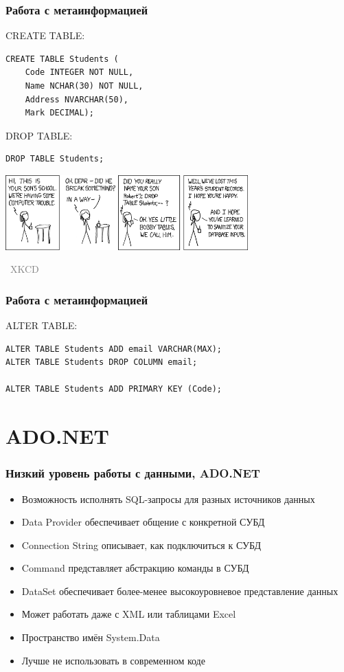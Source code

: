 \documentclass[xetex,mathserif,serif]{beamer}
\newcommand{\attribution}[1] {
\vspace{-5mm}\begin{flushright}\begin{scriptsize}\textcolor{gray}{\textcopyright\, #1}\end{scriptsize}\end{flushright}
}
\begin{document}
	\begin{frame}[fragile]
		\frametitle{Работа с метаинформацией}
		\begin{small}
			CREATE TABLE:
			\begin{verbatim}
CREATE TABLE Students (
    Code INTEGER NOT NULL,
    Name NCHAR(30) NOT NULL,
    Address NVARCHAR(50),
    Mark DECIMAL);
			\end{verbatim}

			\vspace{3mm}
			DROP TABLE:
			\begin{verbatim}
DROP TABLE Students;
			\end{verbatim}
		\end{small}

		\begin{center}
			\includegraphics[width=0.7\textwidth]{bobbyTables.png}
			\attribution{XKCD}
		\end{center}
	\end{frame}

	\begin{frame}[fragile]
		\frametitle{Работа с метаинформацией}
		ALTER TABLE:
		\begin{verbatim}
ALTER TABLE Students ADD email VARCHAR(MAX);
ALTER TABLE Students DROP COLUMN email;

ALTER TABLE Students ADD PRIMARY KEY (Code);

		\end{verbatim}
	\end{frame}

	\section{ADO.NET}

	\begin{frame}
		\frametitle{Низкий уровень работы с данными, ADO.NET}
		\begin{itemize}
			\item Возможность исполнять SQL-запросы для разных источников данных
			\item Data Provider обеспечивает общение с конкретной СУБД
			\item Connection String описывает, как подключиться к СУБД
			\item Command представляет абстракцию команды в СУБД
			\item DataSet обеспечивает более-менее высокоуровневое представление данных
			\item Может работать даже с XML или таблицами Excel
			\item Пространство имён System.Data
			\item Лучше не использовать в современном коде
		\end{itemize}
	\end{frame}
\end{document}

